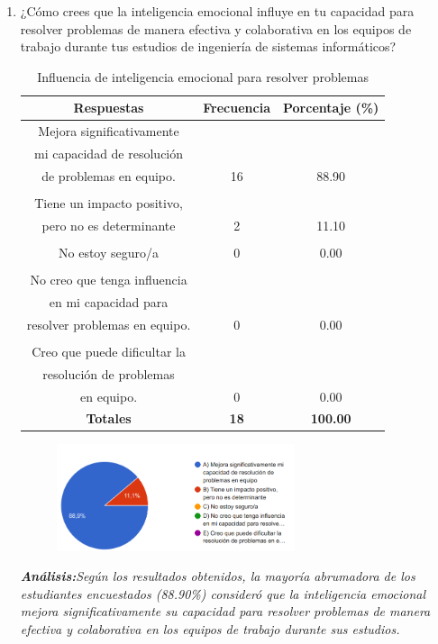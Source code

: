\documentclass[journal]{IEEEtran}
\begin{document}
\begin{enumerate}
\item¿Cómo crees que la inteligencia emocional influye en tu capacidad para resolver problemas de manera efectiva y colaborativa en los equipos de trabajo durante tus estudios de ingeniería de sistemas informáticos?
	\begin{table}[H]
		\renewcommand{\arraystretch}{1.3}
		\centering
		\caption{Influencia de inteligencia emocional para resolver problemas}
		\begin{tabular}{c c c}
			\hline
			\textbf{Respuestas} & \textbf{Frecuencia} & \textbf{Porcentaje (\%)}\\
			\hline
			Mejora significativamente \\mi capacidad de resolución \\de problemas en equipo. & 16 & 88.90 \\
			\\Tiene un impacto positivo, \\pero no es determinante & 2 & 11.10 \\
			\\No estoy seguro/a & 0 & 0.00\\
			\\No creo que tenga influencia \\en mi capacidad para \\resolver problemas en equipo. & 0 & 0.00\\
			\\Creo que puede dificultar la \\resolución de problemas \\en equipo. & 0 & 0.00\\
			\hline
			\textbf{Totales} &\textbf{18}& \textbf{100.00}\\
			\hline
		\end{tabular}
	\end{table}
	\begin{figure}[h]
		\centering
		\includegraphics[width=07cm]{Pregunta 8}
	\end{figure}
	\textit{\textbf{Análisis:}Según los resultados obtenidos, la mayoría abrumadora de los estudiantes encuestados (88.90\%) consideró que la inteligencia emocional mejora significativamente su capacidad para resolver problemas de manera efectiva y colaborativa en los equipos de trabajo durante sus estudios.
}
\end{enumerate}
\end{document}
